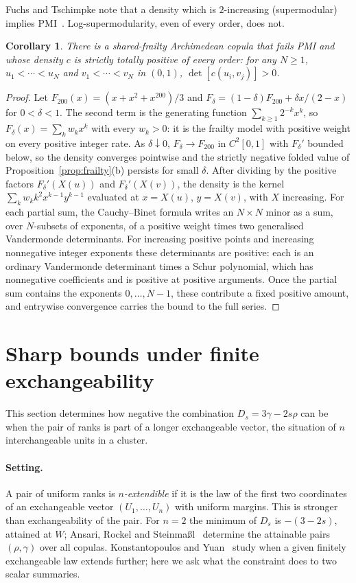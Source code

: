 \documentclass[11pt,a4paper]{article}
\newtheorem{corollary}[theorem]{Corollary}
\theoremstyle{remark}
\begin{document}
Fuchs and Tschimpke note that a density which is $2$-increasing (supermodular) implies PMI~\cite[Remark~1]{FT}. Log-supermodularity, even of every order, does not.

\begin{corollary}\label{cor:tp}
There is a shared-frailty Archimedean copula that fails PMI and whose density $c$ is strictly totally positive of every order: for any $N\geq1$, $u_1<\cdots<u_N$ and $v_1<\cdots<v_N$ in $(0,1)$, $\det[c(u_i,v_j)]>0$.
\end{corollary}
\begin{proof}
Let $F_{200}(x)=(x+x^2+x^{200})/3$ and $F_\delta=(1-\delta)F_{200}+\delta x/(2-x)$ for $0<\delta<1$. The second term is the generating function $\sum_{k\geq1}2^{-k}x^k$, so $F_\delta(x)=\sum_kw_kx^k$ with every $w_k>0$: it is the frailty model with positive weight on every positive integer rate. As $\delta\downarrow0$, $F_\delta\to F_{200}$ in $C^2[0,1]$ with $F_\delta'$ bounded below, so the density converges pointwise and the strictly negative folded value of Proposition~\ref{prop:frailty}(b) persists for small $\delta$. After dividing by the positive factors $F_\delta'(X(u))$ and $F_\delta'(X(v))$, the density is the kernel $\sum_kw_kk^2x^{k-1}y^{k-1}$ evaluated at $x=X(u)$, $y=X(v)$, with $X$ increasing. For each partial sum, the Cauchy--Binet formula writes an $N\times N$ minor as a sum, over $N$-subsets of exponents, of a positive weight times two generalised Vandermonde determinants. For increasing positive points and increasing nonnegative integer exponents these determinants are positive: each is an ordinary Vandermonde determinant times a Schur polynomial, which has nonnegative coefficients and is positive at positive arguments. Once the partial sum contains the exponents $0,\ldots,N-1$, these contribute a fixed positive amount, and entrywise convergence carries the bound to the full series.
\end{proof}

\section{Sharp bounds under finite exchangeability}\label{sec:finite}
This section determines how negative the combination $D_s=3\gamma-2s\rho$ can be when the pair of ranks is part of a longer exchangeable vector, the situation of $n$ interchangeable units in a cluster.

\paragraph{Setting.} A pair of uniform ranks is \emph{$n$-extendible} if it is the law of the first two coordinates of an exchangeable vector $(U_1,\ldots,U_n)$ with uniform margins. This is stronger than exchangeability of the pair. For $n=2$ the minimum of $D_s$ is $-(3-2s)$, attained at $W$; Ansari, Rockel and Steinma{\ss}l~\cite{ars} determine the attainable pairs $(\rho,\gamma)$ over all copulas. Konstantopoulos and Yuan~\cite{ky} study when a given finitely exchangeable law extends further; here we ask what the constraint does to two scalar summaries.
\end{document}
